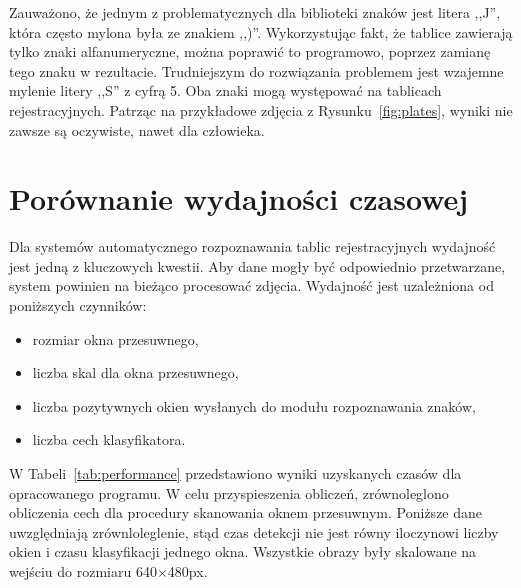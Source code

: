 Zauważono, że jednym z problematycznych dla biblioteki znaków jest litera ,,J'', która często mylona była ze znakiem ,,)''.
Wykorzystując fakt, że tablice zawierają tylko znaki alfanumeryczne, można poprawić to programowo, poprzez zamianę tego znaku w rezultacie.
Trudniejszym do rozwiązania problemem jest wzajemne mylenie litery ,,S'' \linebreak z cyfrą 5.
Oba znaki mogą występować na tablicach rejestracyjnych.
Patrząc na przykładowe zdjęcia z Rysunku~\ref{fig:plates}, wyniki nie zawsze są oczywiste, nawet dla człowieka.



\section{Porównanie wydajności czasowej}
Dla systemów automatycznego rozpoznawania tablic rejestracyjnych wydajność jest jedną z kluczowych kwestii.
Aby dane mogły być odpowiednio przetwarzane, system powinien na bieżąco procesować zdjęcia.
Wydajność jest uzależniona od poniższych czynników:
\begin{itemize}
    \item rozmiar okna przesuwnego,
    \item liczba skal dla okna przesuwnego,
    \item liczba pozytywnych okien wysłanych do modułu rozpoznawania znaków,
    \item liczba cech klasyfikatora.
\end{itemize}
W Tabeli~\ref{tab:performance} przedstawiono wyniki uzyskanych czasów dla opracowanego programu.
W celu przyspieszenia obliczeń, zrównoleglono obliczenia cech dla procedury skanowania oknem przesuwnym.
Poniższe dane uwzględniają zrównloleglenie, stąd czas detekcji nie jest równy iloczynowi liczby okien i czasu klasyfikacji jednego okna.
Wszystkie obrazy były skalowane na wejściu do rozmiaru 640$\times$480px.
